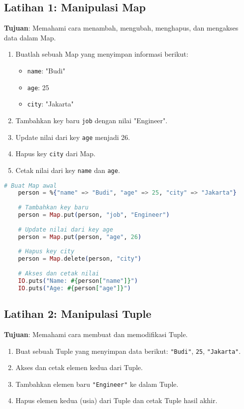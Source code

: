 \subsection{Latihan 1: Manipulasi Map}
\textbf{Tujuan}: Memahami cara menambah, mengubah, menghapus, dan mengakses data dalam Map.

\begin{enumerate}
	\item Buatlah sebuah Map yang menyimpan informasi berikut:
	\begin{itemize}
		\item \texttt{name}: "Budi"
		\item \texttt{age}: 25
		\item \texttt{city}: "Jakarta"
	\end{itemize}
	\item Tambahkan key baru \texttt{job} dengan nilai "Engineer".
	\item Update nilai dari key \texttt{age} menjadi 26.
	\item Hapus key \texttt{city} dari Map.
	\item Cetak nilai dari key \texttt{name} dan \texttt{age}.
\end{enumerate}

\begin{lstlisting}[language=Elixir]
	# Buat Map awal
	person = %{"name" => "Budi", "age" => 25, "city" => "Jakarta"}
	
	# Tambahkan key baru
	person = Map.put(person, "job", "Engineer")
	
	# Update nilai dari key age
	person = Map.put(person, "age", 26)
	
	# Hapus key city
	person = Map.delete(person, "city")
	
	# Akses dan cetak nilai
	IO.puts("Name: #{person["name"]}")
	IO.puts("Age: #{person["age"]}")
\end{lstlisting}

\subsection{Latihan 2: Manipulasi Tuple}
\textbf{Tujuan}: Memahami cara membuat dan memodifikasi Tuple.

\begin{enumerate}
	\item Buat sebuah Tuple yang menyimpan data berikut: \texttt{"Budi"}, \texttt{25}, \texttt{"Jakarta"}.
	\item Akses dan cetak elemen kedua dari Tuple.
	\item Tambahkan elemen baru \texttt{"Engineer"} ke dalam Tuple.
	\item Hapus elemen kedua (usia) dari Tuple dan cetak Tuple hasil akhir.
\end{enumerate}

